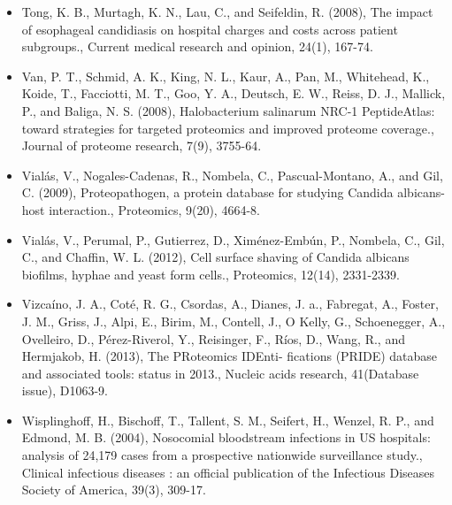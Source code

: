 \begin{itemize}
\item[]{
Tong, K. B., Murtagh, K. N., Lau, C., and Seifeldin, R. (2008), The impact of esophageal 
candidiasis on hospital charges and costs across patient subgroups., Current medical research
and opinion, 24(1), 167-74.
}

\item[]{
Van, P. T., Schmid, A. K., King, N. L., Kaur, A., Pan, M., Whitehead, K., Koide, T., Facciotti,
M. T., Goo, Y. A., Deutsch, E. W., Reiss, D. J., Mallick, P., and Baliga, N. S. (2008), 
Halobacterium salinarum NRC-1 PeptideAtlas: toward strategies for targeted proteomics and
improved proteome coverage., Journal of proteome research, 7(9), 3755-64.
}

\item[]{
Vial\'as, V., Nogales-Cadenas, R., Nombela, C., Pascual-Montano, A., and Gil, C. (2009), 
Proteopathogen, a protein database for studying Candida albicans-host interaction., 
Proteomics, 9(20), 4664-8.
}

\item[]{
Vial\'as, V., Perumal, P., Gutierrez, D., Xim\'enez-Emb\'un, P., Nombela, C., Gil, C., and Chaffin,
W. L. (2012), Cell surface shaving of Candida albicans biofilms, hyphae and yeast form
cells., Proteomics, 12(14), 2331-2339.
}

\item[]{
Vizca\'ino, J. A., Cot\'e, R. G., Csordas, A., Dianes, J. a., Fabregat, A., Foster, J. M., Griss, J.,
Alpi, E., Birim, M., Contell, J., O Kelly, G., Schoenegger, A., Ovelleiro, D., P\'erez-Riverol,
Y., Reisinger, F., Ríos, D., Wang, R., and Hermjakob, H. (2013), The PRoteomics IDEnti-
fications (PRIDE) database and associated tools: status in 2013., Nucleic acids research,
41(Database issue), D1063-9.
}

\item[]{
Wisplinghoff, H., Bischoff, T., Tallent, S. M., Seifert, H., Wenzel, R. P., and Edmond, M. B.
(2004), Nosocomial bloodstream infections in US hospitals: analysis of 24,179 cases from
a prospective nationwide surveillance study., Clinical infectious diseases : an official 
publication of the Infectious Diseases Society of America, 39(3), 309-17.
}



\end{itemize}
